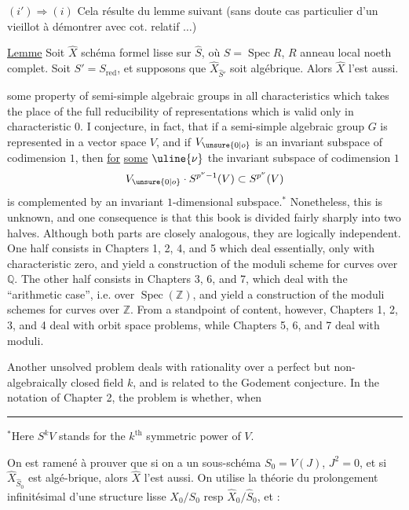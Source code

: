 $(i')\Longrightarrow(i)$ Cela résulte du lemme suivant (sans doute cas particulier d'un  vieillot à démontrer avec  cot. relatif $\ldots$)

\uline{Lemme} Soit $\widehat X$ schéma formel  lisse sur $\widehat S$, où $S=\operatorname{Spec}R$, $R$ anneau local noeth complet. Soit $S'=S_{\mathrm{red}}$, et supposons que $\widehat X_{\widehat S'}$ soit algébrique. Alors $\widehat X$ l'est aussi.



some property of semi-simple algebraic groups in all characteristics which takes the place of the full reducibility of representations which is valid only in characteristic $0$. I conjecture, in fact, that if a semi-simple algebraic group $G$ is represented in a vector space $V$, and if $V_{\unsure{0|o}}$ is an invariant subspace of codimension $1$, then \uline{for} \uline{some} $\uline{\nu}$ the invariant subspace of codimension $1$
\[
V_{\unsure{0|o}}\cdot S^{p^\nu-1}(V)\subset S^{p^\nu}(V)
\]
is complemented by an invariant $1$-dimensional subspace.$^*$ Nonetheless, this is unknown, and one consequence is that this book is divided fairly sharply into two halves. Although both parts are closely analogous, they are logically independent. One half consists in Chapters 1, 2, 4, and 5 which deal essentially, only with characteristic zero, and yield a construction of the moduli scheme for curves over $\mathbb Q$. The other half consists in Chapters 3, 6, and 7, which deal with the ``arithmetic case'', i.e. over $\operatorname{Spec}(\mathbb Z)$, and yield a construction of the moduli schemes for curves over $\mathbb Z$. From a standpoint of content, however, Chapters 1, 2, 3, and 4 deal with orbit space problems, while Chapters 5, 6, and 7 deal with moduli.

Another unsolved problem deals with rationality over a perfect but non-algebraically closed field $k$, and is related to the Godement conjecture. In the notation of Chapter 2, the problem is whether, when

\noindent\rule{2cm}{.4pt}

$^*$Here $S^kV$ stands for the $k^{\mathrm{th}}$ symmetric power of $V$.


On est ramené à prouver que si  on a un sous-schéma $S_0=V(J)$, $J^2=0$, et si $\widehat X_{\widehat S_0}$ est algé-brique, alors $\widehat X$ l'est aussi. On utilise la théorie du prolongement infinitésimal d'une structure lisse $X_0/S_0$ resp $\widehat X_0/\widehat S_0$, et :

